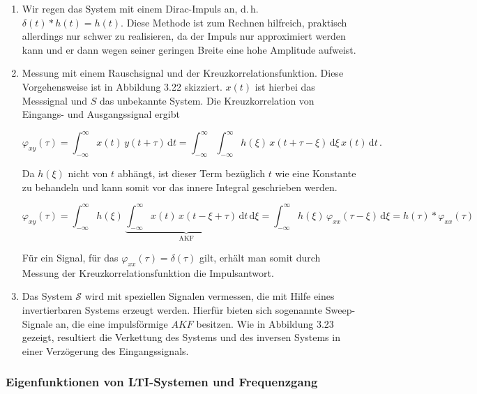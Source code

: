 \begin{enumerate}
  \item Wir regen das System mit einem Dirac-Impuls an, d.\,h.\ $\delta(t) * h(t) = h(t)$. Diese Methode ist zum Rechnen hilfreich, praktisch allerdings nur schwer zu realisieren, da der Impuls nur approximiert werden kann und er dann wegen seiner geringen Breite eine hohe Amplitude aufweist.

  \item Messung mit einem Rauschsignal und der Kreuzkorrelationsfunktion. Diese Vorgehensweise ist in Abbildung 3.22 skizziert. $x(t)$ ist hierbei das Messsignal und $S$ das unbekannte System. Die Kreuzkorrelation von Eingangs- und Ausgangssignal ergibt

$$
\varphi_{xy}(\tau) = \int_{-\infty}^{\infty} x(t)\,y(t + \tau)\,\mathrm{d}t = \int_{-\infty}^{\infty}\int_{-\infty}^{\infty} h(\xi)\,x(t + \tau - \xi)\,\mathrm{d}\xi\,x(t)\,\mathrm{d}t\,.
$$

  Da $h(\xi)$ nicht von $t$ abhängt, ist dieser Term bezüglich $t$ wie eine Konstante zu behandeln und kann somit vor das innere Integral geschrieben werden.

$$
\varphi_{xy}(\tau) = \int_{-\infty}^{\infty} h(\xi)\,\underbrace{\int_{-\infty}^{\infty} x(t)\,x(t - \xi + \tau)\,\mathrm{d}t}_{\mathrm{AKF}} \,\mathrm{d}\xi = \int_{-\infty}^{\infty} h(\xi)\,\varphi_{xx}(\tau - \xi)\,\mathrm{d}\xi = h(\tau) * \varphi_{xx}(\tau)
$$

  Für ein Signal, für das $\varphi_{xx}(\tau) = \delta(\tau)$ gilt, erhält man somit durch Messung der Kreuzkorrelationsfunktion die Impulsantwort.


  \item Das System $\mathcal{S}$ wird mit speziellen Signalen vermessen, die mit Hilfe eines invertierbaren Systems erzeugt werden. Hierfür bieten sich sogenannte Sweep-Signale an, die eine impulsförmige $AKF$ besitzen. Wie in Abbildung 3.23 gezeigt, resultiert die Verkettung des Systems und des inversen Systems in einer Verzögerung des Eingangssignals.

\end{enumerate}

\subsubsection*{Eigenfunktionen von LTI-Systemen und Frequenzgang}

